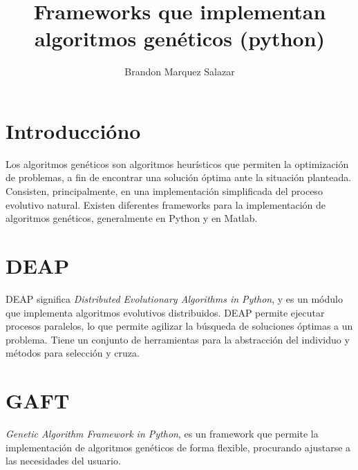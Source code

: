\documentclass[10pt]{article}
\author{%
Brandon Marquez Salazar
}
\title{%
  Frameworks que implementan algoritmos genéticos (python)
}
\begin{document}
\maketitle

  \section*{Introduccióno}

  Los algoritmos genéticos son algoritmos heurísticos que permiten la
  optimización de problemas, a fin de encontrar una solución óptima ante
  la situación planteada. Consisten, principalmente, en una implementación
  simplificada del proceso evolutivo natural. Existen diferentes
  frameworks para la implementación de algoritmos genéticos, generalmente
  en Python y en Matlab.

  \section*{DEAP}

  DEAP significa \textit{Distributed Evolutionary Algorithms in Python},
  y es un módulo que implementa algoritmos evolutivos distribuidos. DEAP
  permite ejecutar procesos paralelos, lo que permite agilizar la búsqueda
  de soluciones óptimas a un problema. Tiene un conjunto de herramientas
  para la abstracción del individuo y métodos para selección y cruza.

  \section*{GAFT}

  \textit{Genetic Algorithm Framework in Python}, es un framework que
  permite la implementación de algoritmos genéticos de forma flexible,
  procurando ajustarse a las necesidades del usuario.
\end{document}
